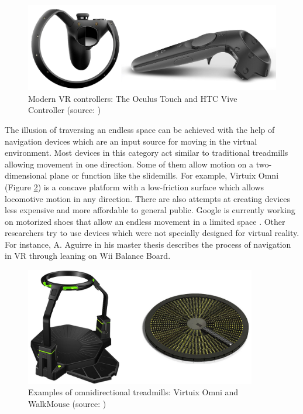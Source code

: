 \begin{figure}[th]
\centering
\includegraphics[width=1\textwidth]{img/modern_controllers.png}
\caption{Modern VR controllers: The Oculus Touch and HTC Vive Controller (source:  \cite{VR_TECHNOLOGY}\cite{VIVE_IMAGE})}
\label{fig:CONTROLLERS_IMAGE}
\end{figure}

The illusion of traversing an endless space can be achieved with the help of navigation devices which are an input source for moving in the virtual environment. Most devices in this category act similar to traditional treadmills allowing movement in one direction. Some of them allow motion on a two-dimensional plane or function like the slidemills. For example, Virtuix Omni (Figure \ref{fig:VIRTUX_IMAGE}) is a concave platform with a low-friction surface which allows locomotive motion in any direction. There are also attempts at creating devices less expensive and more affordable to general public. Google is currently working on motorized shoes that allow an endless movement in a limited space \cite{VR_SHOES}. Other researchers try to use devices which were not specially designed for virtual reality. For instance, A. Aguirre in his master thesis \cite{JOYSTICK} describes the process of navigation in VR through leaning on Wii Balance Board.

\begin{figure}[th]
\centering
\includegraphics[width=0.9\textwidth]{img/vr_threadmills.png}
\caption{Examples of omnidirectional treadmills: Virtuix Omni and WalkMouse (source:  \cite{VR_TECHNOLOGY})}
\label{fig:VIRTUX_IMAGE}
\end{figure}

